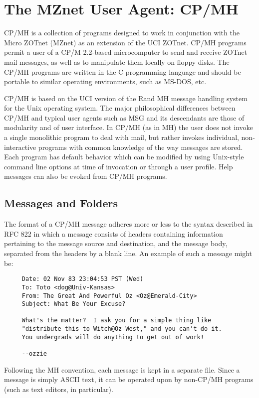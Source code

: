 \section*	{The MZnet User Agent: CP/MH}
CP/MH is a collection of programs designed to work in conjunction
with the Micro ZOTnet (MZnet) as an extension of the UCI ZOTnet.
CP/MH programs permit a user of a CP/M 2.2-based microcomputer to
send and receive ZOTnet mail messages, as well as to manipulate
them locally on floppy disks.  
The CP/MH programs are written in the C programming language and 
should be portable to similar operating environments, such as MS-DOS, etc.

CP/MH is based on the UCI version of the Rand MH message handling system
\cite{MH}
for the Unix operating system.  
The major philosophical differences between CP/MH and typical user agents
such as MSG
\cite{Vittal81}
and its descendants are those of modularity and of user interface.  
In CP/MH (as in MH) the user does not invoke a single monolithic program 
to deal with mail, but rather invokes individual, 
non-interactive programs with common knowledge
of the way messages are stored.  
Each program has default behavior which can be modified by using Unix-style 
command line options at time of invocation or through a user profile.  
Help messages can also be evoked from CP/MH programs.

\subsection*	{Messages and Folders}
The format of a CP/MH message adheres more or less to the syntax
described in RFC 822
in which a message consists of headers containing information pertaining 
to the message source and destination, 
and the message body, separated from the headers by a blank line.  
An example of such a message might be:

\begin{verbatim}
     Date: 02 Nov 83 23:04:53 PST (Wed) 
     To: Toto <dog@Univ-Kansas>
     From: The Great And Powerful Oz <Oz@Emerald-City>
     Subject: What Be Your Excuse?

     What's the matter?  I ask you for a simple thing like
     "distribute this to Witch@Oz-West," and you can't do it.
     You undergrads will do anything to get out of work!

     --ozzie
\end{verbatim}

Following the MH convention, each message is kept in a separate file.  
Since a message is simply ASCII text, it can be operated upon by 
non-CP/MH programs (such as text editors, in particular).

